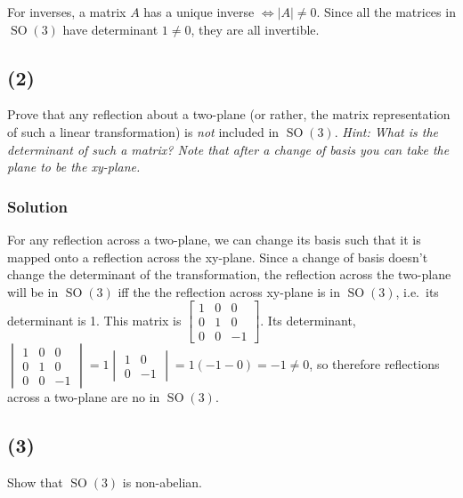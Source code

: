 \documentclass[fleqn]{article}
\DeclareMathOperator{\SO}{SO}
\begin{document}
                For inverses, a matrix $A$ has a unique inverse $\iff |A| \neq 0$.  Since all the matrices in $\SO(3)$ have determinant $1 \neq 0$, they are all invertible.
        
        \subsection{(2)}
        Prove that any reflection about a two-plane (or rather, the matrix representation of such a linear transformation) is \textit{not} included in $\SO(3)$.  \textit{Hint: What is the determinant of such a matrix?  Note that after a change of basis you can take the plane to be the xy-plane.}
            
            \subsubsection{Solution}
            For any reflection across a two-plane, we can change its basis such that it is mapped onto a reflection across the xy-plane.  Since a change of basis doesn't change the determinant of the transformation, the reflection across the two-plane will be in $\SO(3)$ iff the the reflection across xy-plane is in $\SO(3)$, i.e.\ its determinant is 1.  This matrix is $\begin{bmatrix}
                1 & 0 & 0 \\
                0 & 1 & 0 \\
                0 & 0 & -1
            \end{bmatrix}$.  Its determinant, $\begin{vmatrix}
                1 & 0 & 0 \\
                0 & 1 & 0 \\
                0 & 0 & -1
            \end{vmatrix} = 1 \begin{vmatrix}
                1 & 0 \\
                0 & -1
            \end{vmatrix} = 1(-1 - 0) = -1 \neq 0$, so therefore reflections across a two-plane are no in $\SO(3)$.
        
        \subsection{(3)}
        Show that $\SO(3)$ is non-abelian.
            
\end{document}
